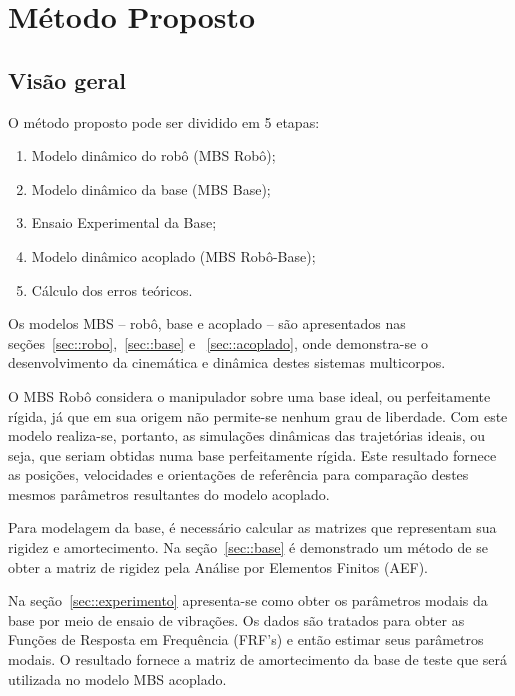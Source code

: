 \chapter{Método Proposto}



\section{Visão geral}

O método proposto pode ser dividido em 5 etapas:
%
\begin{enumerate}
  \item Modelo dinâmico do robô (MBS Robô);
  \item Modelo dinâmico da base (MBS Base);
  \item Ensaio Experimental da Base;
  \item Modelo dinâmico acoplado (MBS Robô-Base);
  \item Cálculo dos erros teóricos.
\end{enumerate}

Os modelos MBS -- robô, base e  acoplado -- são apresentados nas
seções~\ref{sec::robo},~\ref{sec::base} e ~\ref{sec::acoplado}, onde
demonstra-se o desenvolvimento da cinemática e dinâmica destes sistemas
multicorpos.


O MBS Robô considera o manipulador sobre uma base ideal, ou perfeitamente
rígida, já que em sua origem não permite-se nenhum grau de liberdade.
Com este modelo realiza-se, portanto, as simulações dinâmicas das trajetórias
ideais, ou seja, que seriam obtidas numa base perfeitamente rígida. Este
resultado fornece as posições, velocidades e orientações de referência para
comparação destes mesmos parâmetros resultantes do modelo acoplado.

Para modelagem da base, é necessário calcular as matrizes que representam sua
rigidez e amortecimento. Na seção~\ref{sec::base} é demonstrado um método de se
obter a matriz de rigidez pela Análise por Elementos Finitos (AEF).

Na seção~\ref{sec::experimento} apresenta-se como obter os parâmetros modais da
base por meio de ensaio de vibrações. Os dados são tratados para obter as
Funções de Resposta em Frequência (FRF's) e então estimar seus parâmetros
modais. O resultado fornece a matriz de amortecimento da base de teste que será
utilizada no modelo MBS acoplado.

